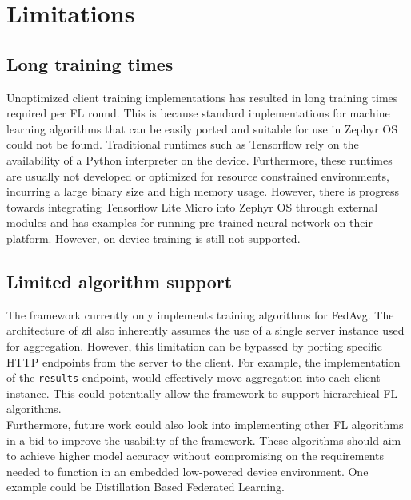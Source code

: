 \documentclass[12pt]{article}
\begin{document}
\section{Limitations}
\subsection{Long training times}
Unoptimized client training implementations has resulted in long training times required per FL
round. This is because standard implementations for machine learning
algorithms that can be easily ported and suitable for use in Zephyr OS could not be found.
Traditional runtimes such as Tensorflow\cite{tensorflow2015-whitepaper} rely on the availability of a Python interpreter on
the device. Furthermore, these runtimes are usually not developed or optimized for resource
constrained environments, incurring a large binary size and high memory usage. However, there is
progress towards integrating Tensorflow Lite Micro into Zephyr OS through external modules
and has examples for running pre-trained neural network on their platform. However, on-device
training is still not supported.

\subsection{Limited algorithm support}
The framework currently only implements training algorithms for FedAvg. The architecture of zfl also
inherently assumes the use of a single server instance used for aggregation. However, this
limitation can be bypassed by porting specific HTTP endpoints from the server to the client. For
example, the implementation of the \verb|results| endpoint, would effectively move aggregation into
each client instance. This could potentially allow the framework to support hierarchical FL
algorithms\cite{rana_2023_hierarchical}.\\

Furthermore, future work could also look into implementing other FL algorithms in a bid to improve
the usability of the framework. These algorithms should aim to achieve higher model accuracy without
compromising on the requirements needed to function in an embedded low-powered device environment.
One example could be Distillation Based Federated Learning\cite{liu2022efficient}.


\pagebreak


\end{document}
